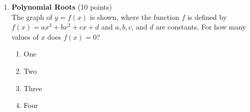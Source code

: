 \begin{enumerate}
  \newpage

  \item \textbf{Polynomial Roots} (10 points)\\
  The graph of $y=f(x)$ is shown, where the function $f$ is defined by $f(x)=a x^{3}+b x^{2}+c x+d$ and $a, b, c$, and $d$ are constants. For how many values of $x$ does $f(x)=0$?
  \begin{enumerate}[label=(\Alph*)]
    \item One
    \item Two
    \item Three
    \item Four
  \end{enumerate}
  \begin{subanswer}
  \end{subanswer}

  \newpage


\end{enumerate}
